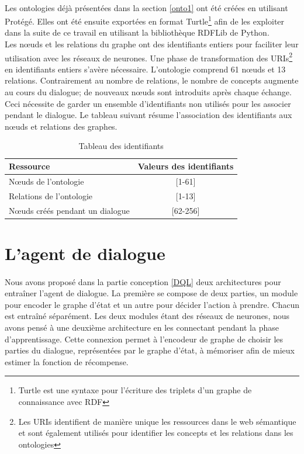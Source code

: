 \paragraph{}Les ontologies déjà présentées dans la section \ref{onto1} ont été créées en utilisant Protégé. Elles ont été ensuite exportées en format Turtle\footnote{Turtle est une syntaxe pour l'écriture des triplets d'un graphe de connaissance avec RDF} afin de les exploiter dans la suite de ce travail en utilisant la bibliothèque RDFLib de Python.\\[6pt]
Les n\oe{}uds et les relations du graphe ont des identifiants entiers pour faciliter leur utilisation avec les réseaux de neurones. Une phase de transformation des URIs\footnote{Les URIs identifient de manière unique les ressources dans le web sémantique et sont également utilisés pour identifier les concepts et les relations dans les ontologies} en identifiants entiers s'avère nécessaire. L'ontologie comprend 61 n\oe{}uds et 13 relations. Contrairement au nombre de relations, le nombre de concepts augmente au cours du dialogue; de nouveaux n\oe{}uds sont introduits après chaque échange. Ceci nécessite de garder un ensemble d'identifiants non utilisés pour les associer pendant le dialogue. Le tableau suivant résume l'association des identifiants aux n\oe{}uds et relations des graphes.
\begin{table}[H]
	\begin{center}
		
		\begin{tabular}{|l|c|}
			\hline
			\textbf{Ressource} & \textbf{Valeurs des identifiants}\\
			\hline
			N\oe{}uds de l'ontologie & [1-61]\\
			\hline
			Relations de l'ontologie & [1-13]\\
			\hline
			N\oe{}uds créés pendant un dialogue & [62-256]\\
			\hline
		\end{tabular}
		\caption{Tableau des identifiants}\label{table_ids}
	\end{center}
\end{table}
\section{L'agent de dialogue}\label{DMReal}
\paragraph{}Nous avons proposé dans la partie conception \ref{DQL} deux architectures pour entraîner l'agent de dialogue. La première se compose de deux parties, un module pour encoder le graphe d'état et un autre pour décider l'action à prendre. Chacun est entraîné séparément. Les deux modules étant des réseaux de neurones, nous avons pensé à une deuxième architecture en les connectant pendant la phase d'apprentissage. Cette connexion permet à l'encodeur de graphe de choisir les parties du dialogue, représentées par le graphe d'état, à mémoriser afin de mieux estimer la fonction de récompense.
